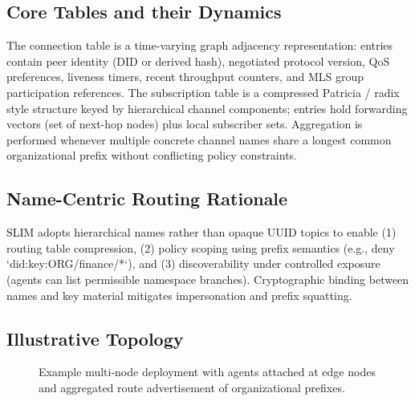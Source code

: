 \documentclass{article}
\theoremstyle{definition}
\theoremstyle{remark}
\begin{document}
\subsection{Core Tables and their Dynamics}
The connection table is a time-varying graph adjacency representation: entries
contain peer identity (DID or derived hash), negotiated protocol version, QoS
preferences, liveness timers, recent throughput counters, and MLS group
participation references. The subscription table is a compressed Patricia /
radix style structure keyed by hierarchical channel components; entries hold
forwarding vectors (set of next-hop nodes) plus local subscriber sets.
Aggregation is performed whenever multiple concrete channel names share a
longest common organizational prefix without conflicting policy constraints.

\subsection{Name-Centric Routing Rationale}
SLIM adopts hierarchical names rather than opaque UUID topics to enable (1)
routing table compression, (2) policy scoping using prefix semantics (e.g.,
deny `did:key:ORG/finance/*`), and (3) discoverability under controlled
exposure (agents can list permissible namespace branches). Cryptographic
binding between names and key material mitigates impersonation and prefix
squatting.

\subsection{Illustrative Topology}
\begin{figure}[H]
  \centering
  \caption{Example multi-node deployment with agents attached at edge nodes and aggregated route advertisement of organizational prefixes.}
  \label{fig:topology}
\end{figure}
\end{document}
